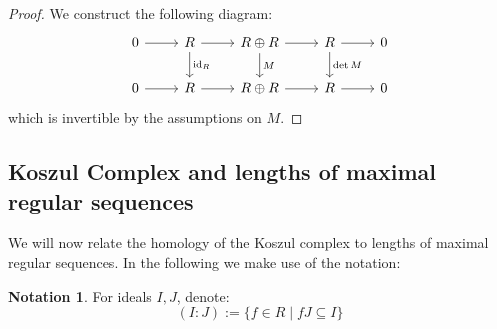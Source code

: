 \documentclass[12pt]{article}
\theoremstyle{plain}
\theoremstyle{definition}
\newtheorem{notation}[thm]{Notation}
\begin{document}
\begin{proof}
	We construct the following diagram:
	\begin{equation}
		\begin{tikzcd}
			0\arrow[r] & R\arrow[r]\arrow[d,"{\operatorname{id}_R}"] & R \oplus R\arrow[r]\arrow[d,"{M}"] & R\arrow[d,"{\operatorname{det}M}"]\arrow[r] & 0\\
			0\arrow[r] & R\arrow[r] & R \oplus R\arrow[r] & R\arrow[r] & 0
		\end{tikzcd}
	\end{equation}
	which is invertible by the assumptions on $M$.
\end{proof}

\subsection{Koszul Complex and lengths of maximal regular sequences}
We will now relate the homology of the Koszul complex to lengths of maximal regular sequences. In the following we make use of the notation:
\begin{notation}
	For ideals $I,J$, denote:
	\begin{equation}
		(I:J) := \lbrace f \in R \mid fJ \subseteq I\rbrace
	\end{equation}
\end{notation}
\end{document}
